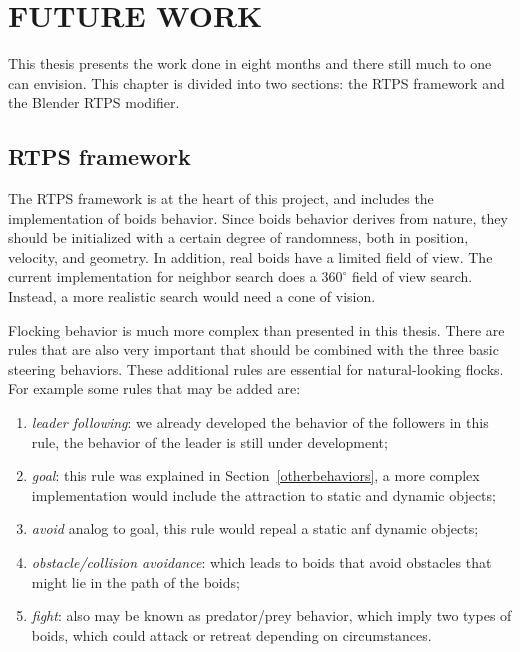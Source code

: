 \chapter{FUTURE WORK}\label{chap8}

This thesis presents the work done in eight months and there still much to one can envision. This chapter is  divided into two sections: the RTPS framework and the Blender RTPS modifier.

\section{RTPS framework}

The RTPS framework is at the heart of this project, and includes the implementation of boids behavior. Since boids behavior derives from nature, they should be initialized with a certain degree of randomness, both in position, velocity, and geometry. In addition, real boids have a limited field of view. The current implementation for neighbor search does a $360^{\circ}$ field of view search. Instead, a more realistic search would need a cone of vision.

Flocking behavior is much more complex than presented in this thesis. There are rules that are also very important that should be combined with the three basic steering behaviors. These additional rules are essential for natural-looking flocks. For example some rules that may be added are: 

\begin{enumerate}
\item{\textit{leader following}: we already developed the behavior of the followers in this rule, the behavior of the leader  is still under development;}
\item{\textit{goal}: this rule was explained in Section~\ref{otherbehaviors}, a more complex implementation would include the attraction to static and dynamic objects;}
\item{\textit{avoid} analog to goal, this rule would repeal a static anf dynamic objects;} 
\item{\textit{obstacle/collision avoidance}: which leads to boids that avoid obstacles that might lie in the path of the boids;}
\item{\textit{fight}: also may be known as predator/prey behavior, which imply two types of boids, which could attack or retreat depending on circumstances.}
\end{enumerate}

